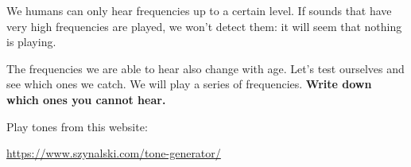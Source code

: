 \documentclass[12pt,noauthor,nooutcomes,hints,handout]{ximera}
\begin{document}
\begin{question}
We humans can only hear frequencies up to a certain level. If sounds that have very high frequencies are played, we won't detect them: it will seem that nothing is playing. 

The frequencies we are able to hear also change with age. Let's test ourselves and see which ones we catch. We will play a series of frequencies. \textbf{Write down which ones you cannot hear.}

\end{question}
\begin{instructorNotes}
Play tones from this website:

\begin{center}
    \url{https://www.szynalski.com/tone-generator/}
\end{center}
\end{instructorNotes}
\end{document}
